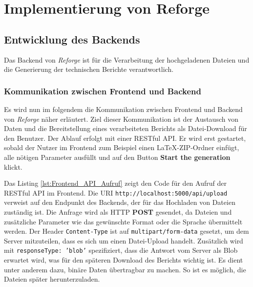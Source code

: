 \chapter{Implementierung von Reforge}

\section{Entwicklung des Backends}
Das Backend von \textit{Reforge} ist für die Verarbeitung der hochgeladenen Dateien und die Generierung der technischen Berichte verantwortlich. 


\subsection{Kommunikation zwischen Frontend und Backend}
\label{subse:kommu_froback}

Es wird nun im folgendem die Kommunikation zwischen Frontend und Backend von \textit{Reforge} näher erläutert. Ziel dieser Kommunikation ist der Austausch von Daten und die Bereitstellung eines verarbeiteten Berichts als Datei-Download für den Benutzer. Der Ablauf erfolgt mit einer RESTful \ac{API}. Er wird erst gestartet, sobald der Nutzer im Frontend zum Beispiel einen LaTeX-ZIP-Ordner einfügt, alle nötigen Parameter ausfüllt und auf den Button \textbf{Start the generation} klickt.

Das Listing \ref{lst:Frontend_API_Aufruf} zeigt den Code für den Aufruf der RESTful \ac{API} im Frontend. Die \ac{URI} \texttt{http://localhost:5000/api/upload} verweist auf den Endpunkt des Backends, der für das Hochladen von Dateien zuständig ist. Die Anfrage wird als \ac{HTTP} \textbf{POST} gesendet, da Dateien und zusätzliche Parameter wie das gewünschte Format oder die Sprache übermittelt werden. Der Header \texttt{Content-Type} ist auf \texttt{multipart/form-data} gesetzt, um dem Server mitzuteilen, dass es sich um einen Datei-Upload handelt. Zusätzlich wird mit \texttt{responseType: 'blob'} spezifiziert, dass die Antwort vom Server als \ac{Blob} erwartet wird, was für den späteren Download des Berichts wichtig ist. Es dient unter anderem dazu, binäre Daten übertragbar zu machen. So ist es möglich, die Dateien später herunterzuladen.



